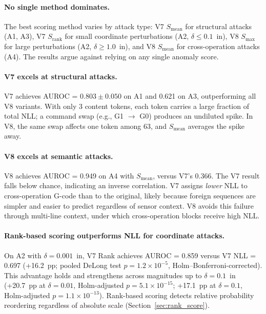 \paragraph{No single method dominates.}
The best scoring method varies by attack type: V7 $S_{\text{mean}}$ for structural attacks (A1, A3), V7 $S_{\text{rank}}$ for small coordinate perturbations (A2, $\delta \leq 0.1$~in), V8 $S_{\max}$ for large perturbations (A2, $\delta \geq 1.0$~in), and V8 $S_{\text{mean}}$ for cross-operation attacks (A4).
The results argue against relying on any single anomaly score.

\paragraph{V7 excels at structural attacks.}
V7 achieves AUROC = $0.803 \pm 0.050$ on A1 and 0.621 on A3, outperforming all V8 variants.
With only 3 content tokens, each token carries a large fraction of total NLL; a command swap (e.g., G1 $\to$ G0) produces an undiluted spike.
In V8, the same swap affects one token among 63, and $S_{\text{mean}}$ averages the spike away.

\paragraph{V8 excels at semantic attacks.}
V8 achieves AUROC = 0.949 on A4 with $S_{\text{mean}}$, versus V7's 0.366.
The V7 result falls below chance, indicating an inverse correlation.
V7 assigns \emph{lower} NLL to cross-operation G-code than to the original, likely because foreign sequences are simpler and easier to predict regardless of sensor context.
V8 avoids this failure through multi-line context, under which cross-operation blocks receive high NLL.

\paragraph{Rank-based scoring outperforms NLL for coordinate attacks.}
On A2 with $\delta = 0.001$~in, V7 Rank achieves AUROC = 0.859 versus V7 NLL = 0.697 (+16.2~pp; pooled DeLong test $p = 1.2\times10^{-5}$, Holm--Bonferroni-corrected).
This advantage holds and strengthens across magnitudes up to $\delta = 0.1$~in (+20.7~pp at $\delta = 0.01$, Holm-adjusted $p = 5.1\times10^{-15}$; +17.1~pp at $\delta = 0.1$, Holm-adjusted $p = 1.1\times10^{-13}$). Rank-based scoring detects relative probability reordering regardless of absolute scale (Section~\ref{sec:rank_score}).

